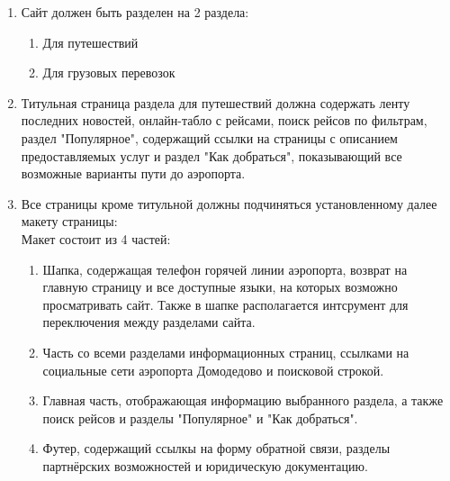 
\begin{enumerate}
  \item Сайт должен быть разделен на 2 раздела:
        \begin{enumerate}
          \item Для путешествий
          \item Для грузовых перевозок
        \end{enumerate}

  \item Титульная страница раздела для путешествий
        должна содержать ленту последних новостей,
        онлайн-табло с рейсами, поиск рейсов по фильтрам,
        раздел "Популярное", содержащий ссылки на
        страницы с описанием предоставляемых услуг и
        раздел "Как добраться", показывающий все
        возможные варианты пути до аэропорта.

  \item Все страницы кроме титульной должны подчиняться
        установленному далее макету страницы: \\
        Макет состоит из 4 частей:

        \begin{enumerate}
          \item Шапка, содержащая телефон горячей линии
                аэропорта, возврат на главную страницу и все
                доступные языки, на которых возможно
                просматривать сайт. Также в шапке располагается
                интсрумент для переключения между разделами
                сайта.

          \item Часть со всеми разделами информационных
                страниц, ссылками на социальные сети аэропорта
                Домодедово и поисковой строкой.

          \item Главная часть, отображающая информацию
                выбранного раздела, а также поиск рейсов и разделы
                "Популярное" и "Как добраться".

          \item Футер, содержащий ссылкы на форму обратной
                связи, разделы партнёрских возможностей и
                юридическую документацию.
        \end{enumerate}

\end{enumerate}
